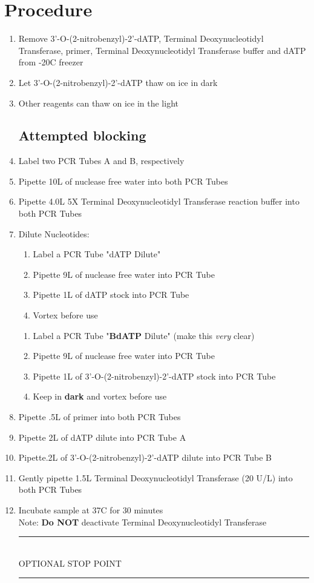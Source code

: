 \documentclass[letterpaper]{article}
\newcommand{\tdt}{Terminal Deoxynucleotidyl Transferase}
\newcommand{\C}{\degree{}C}
\newcommand{\uL}{\micro{}L}
\newcommand{\BdATP}{3'-O-(2-nitrobenzyl)-2'-dATP}
\newcommand{\stopPoint}{\begin{center}
\rule{0.5\textwidth}{.4pt}\\
\vspace{1mm} 
OPTIONAL STOP POINT\\
\rule{0.5\textwidth}{.4pt}
\end{center}}
\begin{document}
\section{Procedure}%
\begin{enumerate} 
\subsection{Sample Preparation}
\item{Remove \BdATP{}, \tdt{}, primer, \tdt{}  buffer and dATP from -20\C{} freezer}
\item{Let \BdATP{} thaw on ice in dark}
\item{Other reagents can thaw on ice in the light}
\subsection{Attempted blocking}
\item{Label two PCR Tubes A and B, respectively}
\item{Pipette 10\uL{} of nuclease free water into both PCR Tubes}
\item{Pipette 4.0\uL{} 5X \tdt{} reaction buffer into both PCR Tubes}
\item{Dilute Nucleotides:
\begin{enumerate}
\item{Label a PCR Tube "dATP Dilute"}
\item{Pipette 9\uL{} of nuclease free water into PCR Tube}
\item{Pipette 1\uL{} of dATP stock into PCR Tube}
\item{Vortex before use}
\end{enumerate}
\begin{enumerate}
\item{Label a PCR Tube "\textbf{BdATP} Dilute" (make this \textit{very} clear)}
\item{Pipette 9\uL{} of nuclease free water into PCR Tube}
\item{Pipette 1\uL{} of \BdATP{} stock into PCR Tube}
\item{Keep in \textbf{dark} and vortex before use}
\end{enumerate}
}
\item{Pipette .5\uL{} of primer into both PCR Tubes}
\item{Pipette 2\uL{} of dATP dilute into PCR Tube A}
\item{Pipette.2\uL{} of \BdATP{} dilute into PCR Tube B}
\item{Gently pipette 1.5\uL{} \tdt{} (20 U/\uL{}) into both PCR Tubes}
\item{Incubate sample at 37\C{} for 30 minutes}\\
Note: \textbf{Do NOT} deactivate \tdt{} 
\stopPoint{} 

\end{enumerate}
\end{document}
